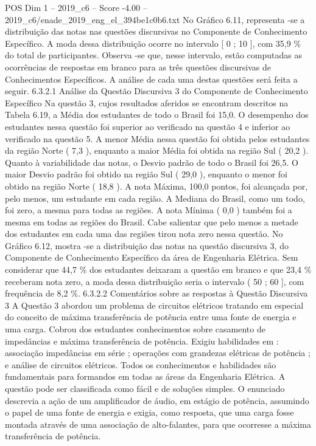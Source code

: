 \begin{textsample}{POS Dim 1 – 2019\_c6 – Score -4.00 – 2019\_c6/enade\_2019\_eng\_el\_394be1c0b6.txt}
No Gráfico 6.11, representa -se a distribuição das notas nas questões discursivas no Componente de Conhecimento Específico.
A moda dessa distribuição ocorre no intervalo [ 0 ; 10 ], com 35,9 \% do total de participantes.
Observa -se que, nesse intervalo, estão computadas as ocorrências de respostas em branco para as três questões discursivas de Conhecimentos Específicos.
A análise de cada uma destas questões será feita a seguir. 6.3.2.1 Análise da Questão Discursiva 3 do Componente de Conhecimento Específico Na questão 3, cujos resultados aferidos se encontram descritos na Tabela 6.19, a Média dos estudantes de todo o Brasil foi 15,0.
O desempenho dos estudantes nessa questão foi superior ao verificado na questão 4 e inferior ao verificado na questão 5.
A menor Média nessa questão foi obtida pelos estudantes da região Norte ( 7,3 ), enquanto a maior Média foi obtida na região Sul ( 20,2 ).
Quanto à variabilidade das notas, o Desvio padrão de todo o Brasil foi 26,5.
O maior Desvio padrão foi obtido na região Sul ( 29,0 ), enquanto o menor foi obtido na região Norte ( 18,8 ).
A nota Máxima, 100,0 pontos, foi alcançada por, pelo menos, um estudante em cada região.
A Mediana do Brasil, como um todo, foi zero, a mesma para todas as regiões.
A nota Mínima ( 0,0 ) também foi a mesma em todas as regiões do Brasil.
Cabe salientar que pelo menos a metade dos estudantes em cada uma das regiões tirou nota zero nessa questão.
No Gráfico 6.12, mostra -se a distribuição das notas na questão discursiva 3, do Componente de Conhecimento Específico da área de Engenharia Elétrica.
Sem considerar que 44,7 \% dos estudantes deixaram a questão em branco e que 23,4 \% receberam nota zero, a moda dessa distribuição seria o intervalo ( 50 ; 60 ], com frequência de 8,2 \%. 6.3.2.2 Comentários sobre as respostas à Questão Discursiva 3 A Questão 3 abordou um problema de circuitos elétricos tratando em especial do conceito de máxima transferência de potência entre uma fonte de energia e uma carga.
Cobrou dos estudantes conhecimentos sobre casamento de impedâncias e máxima transferência de potência.
Exigiu habilidades em : associação impedâncias em série ; operações com grandezas elétricas de potência ; e análise de circuitos elétricos.
Todos os conhecimentos e habilidades são fundamentais para formandos em todas as áreas da Engenharia Elétrica.
A questão pode ser classificada como fácil e de soluções simples.
O enunciado descrevia a ação de um amplificador de áudio, em estágio de potência, assumindo o papel de uma fonte de energia e exigia, como resposta, que uma carga fosse montada através de uma associação de alto-falantes, para que ocorresse a máxima transferência de potência.

\end{textsample}
